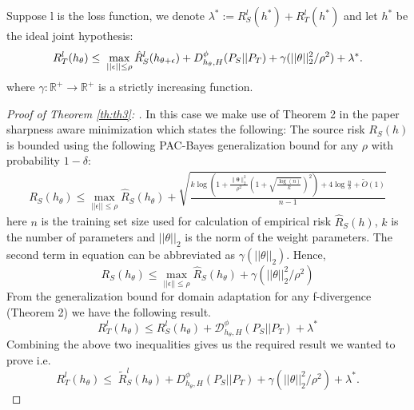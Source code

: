 \documentclass[table,dvipsnames]{article}
\theoremstyle{plain}
\theoremstyle{definition}
\theoremstyle{remark}
\begin{document}
\begin{theorem}
\label{th:th3}
Suppose l is the loss function, we denote $\lambda^* := R_S^l(h^*) + R_T^l(h^*)$ and let $h^*$ be the ideal joint hypothesis:
\begin{equation}
R_{T}^l(h_{\theta}) \leq \; \max_{||\epsilon|| \leq \rho}\hat{R}_S^l(h_{\theta + \epsilon}) + D_{h_{\theta}, H}^{\phi}(P_S||P_T)  \\ + \gamma(||\theta||_2^2/\rho^2) + \lambda^* .
\end{equation}
where $\gamma: \mathbb{R}^{+} \rightarrow \mathbb{R}^{+}$ is a strictly increasing function.
\end{theorem}
\begin{proof}[Proof of Theorem \ref{th:th3}: ]
 In this case we make use of Theorem 2 in the paper sharpness aware minimization \citep{foret2021sharpnessaware} which states the following:
The source risk $R_S(h)$ is bounded using the following PAC-Bayes generalization bound for any $\rho$ with probability $1 - \delta$:
\begin{equation}
\begin{split}
      R_S(h_{\theta}) \leq \max_{||\epsilon|| \leq \rho} \hat{R}_S(h_{\theta})  +\sqrt{\frac{k\log\left(1+\frac{\|\boldsymbol{\theta}\|_2^2}{\rho^2}\left(1+\sqrt{\frac{\log(n)}{k}}\right)^2\right) + 4\log\frac{n}{\delta} + \tilde{O}(1)}{n-1}}  
\end{split}
\end{equation}
here $n$ is the training set size used for calculation of empirical risk $\hat{R}_S(h)$, $k$ is the number of parameters and $||\theta||_2$ is the norm of the weight parameters. The second term in equation can be abbreviated as $\gamma(||\theta||_2)$. Hence,
\begin{equation}
    R_S(h_{\theta}) \leq     \max_{||\epsilon|| \leq \rho} \hat{R}_S(h_{\theta}) + \gamma(||\theta||_2^2/\rho^2) 
\end{equation}
From the generalization bound for domain adaptation for any f-divergence  \citep{acuna2021f} (Theorem 2) we have the following result.
\begin{equation}
R_T^l(h_{\theta}) \leq R_{S}^l(h_{\theta}) + \mathcal{D}_{h_{\theta}, H}^{\phi}(P_S||P_T) + \lambda^*
\end{equation}
Combining the above two inequalities gives us the required result we wanted to prove i.e.
\begin{equation}
         R_{T}^l(h_\theta) \leq \; \tilde{R}_S^l(h_{\theta}) + D_{h_{\theta}, H}^{\phi}(P_S||P_T)  + \gamma(||\theta||_2^2/\rho^2) + \lambda^* .
\end{equation}

\end{proof}
\end{document}
